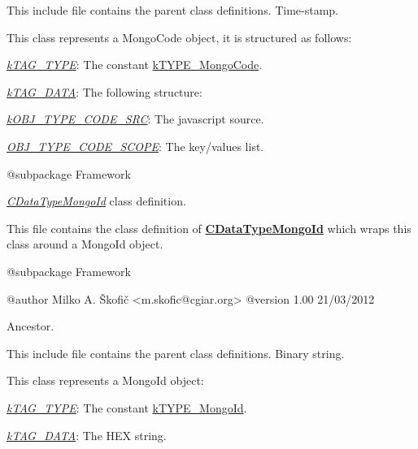 This include file contains the parent class definitions. Time-\/stamp.

This class represents a Mongo\-Code object, it is structured as follows\-:


\begin{DoxyItemize}
\item {\itshape \hyperlink{}{k\-T\-A\-G\-\_\-\-T\-Y\-P\-E}}\-: The constant \hyperlink{}{k\-T\-Y\-P\-E\-\_\-\-Mongo\-Code}. 
\item {\itshape \hyperlink{}{k\-T\-A\-G\-\_\-\-D\-A\-T\-A}}\-: The following structure\-: 
\begin{DoxyItemize}
\item {\itshape \hyperlink{}{k\-O\-B\-J\-\_\-\-T\-Y\-P\-E\-\_\-\-C\-O\-D\-E\-\_\-\-S\-R\-C}}\-: The javascript source. 
\item {\itshape \hyperlink{}{O\-B\-J\-\_\-\-T\-Y\-P\-E\-\_\-\-C\-O\-D\-E\-\_\-\-S\-C\-O\-P\-E}}\-: The key/values list. 
\end{DoxyItemize}
\end{DoxyItemize}

\begin{DoxyVerb} @subpackage        Framework\end{DoxyVerb}


{\itshape \hyperlink{class_c_data_type_mongo_id}{C\-Data\-Type\-Mongo\-Id}} class definition.

This file contains the class definition of {\bfseries \hyperlink{class_c_data_type_mongo_id}{C\-Data\-Type\-Mongo\-Id}} which wraps this class around a Mongo\-Id object.

\begin{DoxyVerb} @subpackage        Framework

 @author            Milko A. Škofič <m.skofic@cgiar.org>
 @version   1.00 21/03/2012\end{DoxyVerb}


Ancestor.

This include file contains the parent class definitions. Binary string.

This class represents a Mongo\-Id object\-:


\begin{DoxyItemize}
\item {\itshape \hyperlink{}{k\-T\-A\-G\-\_\-\-T\-Y\-P\-E}}\-: The constant \hyperlink{}{k\-T\-Y\-P\-E\-\_\-\-Mongo\-Id}. 
\item {\itshape \hyperlink{}{k\-T\-A\-G\-\_\-\-D\-A\-T\-A}}\-: The H\-E\-X string. 
\end{DoxyItemize}


